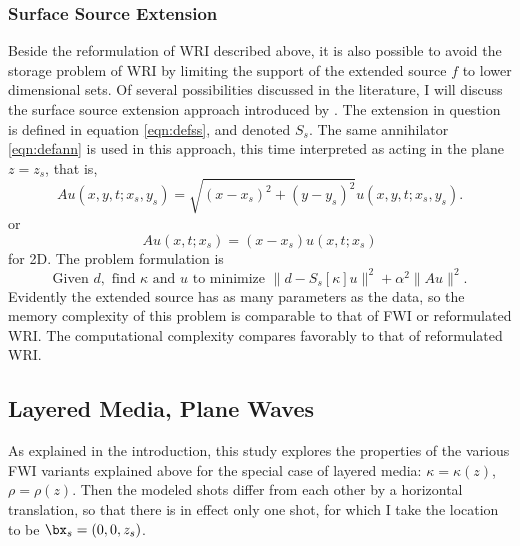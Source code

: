 \subsubsection{Surface Source Extension}
Beside the reformulation of WRI described above, it is also possible
to avoid the storage problem of WRI by limiting the support of the
extended source $f$ to lower dimensional sets. Of several
possibilities discussed in the literature, I will discuss the 
  surface source extension approach introduced by
\cite{HuangNammourSymesDollizal:SEG19}. The extension in question is
defined in equation \ref{eqn:defss}, and denoted $S_s$. The same
annihilator \ref{eqn:defann} is used in this approach, this time
interpreted as acting in the plane $z=z_s$, that is,
\[
  Au(x,y,t;x_s,y_s) = \sqrt{(x-x_s)^2+(y-y_s)^2}u(x,y,t;x_s,y_s).
\]
or
\[
  Au(x,t;x_s) = (x-x_s)u(x,t;x_s)
\]
for 2D. 
The problem formulation is
\begin{equation}
  \label{eqn:defsse}
  \mbox{Given } d, \mbox{ find }\kappa \mbox{ and }u \mbox{ to
    minimize }
  \| d -  S_s[\kappa]u\|^2+\alpha^2\|Au\|^2.
\end{equation}
Evidently the extended source has as many parameters as the data, so
the memory complexity of this problem is comparable to that of FWI or
reformulated WRI. The computational complexity compares favorably to
that of reformulated WRI.

\subsection{Layered Media, Plane Waves}
As explained in the introduction, this study explores the properties
of the various FWI variants explained above for the special case of
layered media: $\kappa = \kappa(z)$,
$\rho=\rho(z)$. Then the modeled shots differ from
each other by a horizontal translation, so that there is in effect
only one shot, for which I take the location to be
$\bx_s=(0,0,z_s)$.

